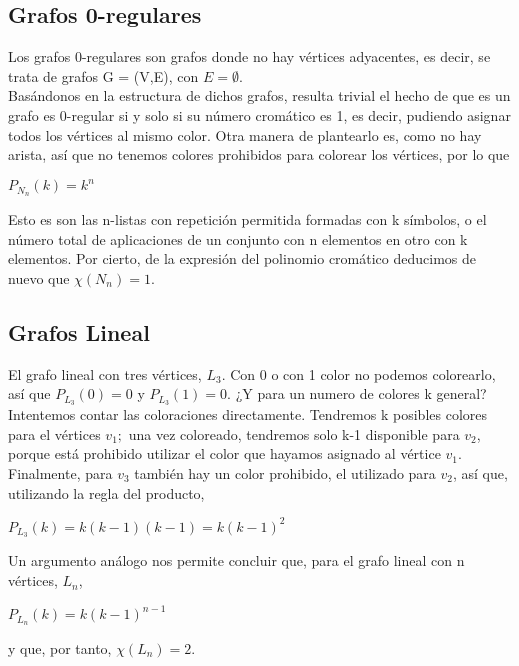\documentclass[12pt]{report}
\begin{document}
\subsection{Grafos 0-regulares}
Los grafos 0-regulares son grafos donde no hay vértices adyacentes, es decir, se trata de grafos G = (V,E), con $E = \emptyset$.\\ Basándonos en la estructura de dichos grafos, resulta trivial el hecho de que es un grafo es 0-regular si y solo si su número cromático es 1, es decir, pudiendo asignar todos los vértices al mismo color.
Otra manera de plantearlo es, como no hay arista, así que no tenemos colores prohibidos para colorear los vértices, por lo que
\begin{center}
$P_{N_n}(k)=k^n$
\end{center}
Esto es son las n-listas con repetición permitida formadas con k símbolos, o el número total de aplicaciones de un conjunto con n elementos en otro con k elementos. Por cierto, de la expresión del polinomio cromático deducimos de nuevo que $\chi(N_n)=1.$

\subsection{Grafos Lineal}
El grafo lineal con tres vértices, $L_3$. Con 0 o con 1 color no podemos colorearlo, así que $P_{L_3}(0)=0$ y $P_{L_3}(1)=0$. ¿Y para un numero de colores k general? Intentemos contar las coloraciones directamente. Tendremos k posibles colores para el vértices $v_1;$ una vez coloreado, tendremos solo k-1 disponible para $v_2$, porque está prohibido utilizar el color que hayamos asignado al vértice $v_1$. Finalmente, para $v_3$ también hay un color prohibido, el utilizado para $v_2$, así que, utilizando la regla del producto,
\begin{center}
$P_{L_3}(k)=k(k-1)(k-1)=k(k-1)^2$
\end{center}
Un argumento análogo nos permite concluir que, para el grafo lineal con n vértices, $L_n$,
\begin{center}
$P_{L_n}(k)=k(k-1)^{n-1}$
\end{center}
y que, por tanto, $\chi (L_n) = 2$.
\end{document}
